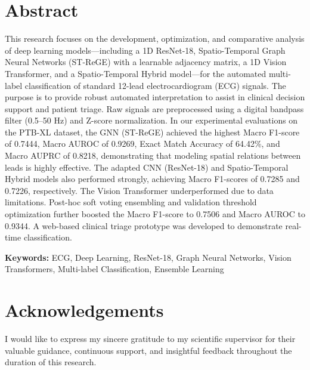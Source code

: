 \documentclass[12pt,a4paper]{report}
\begin{document}
\setcounter{page}{1} %

\chapter*{Abstract}

\begingroup
\sloppy

This research focuses on the development, optimization, and comparative analysis of deep learning models---including a 1D ResNet-18, Spatio-Temporal Graph Neural Networks (ST-ReGE) with a learnable adjacency matrix, a 1D Vision Transformer, and a Spatio-Temporal Hybrid model---for the automated multi-label classification of standard 12-lead electrocardiogram (ECG) signals. The purpose is to provide robust automated interpretation to assist in clinical decision support and patient triage. Raw signals are preprocessed using a digital bandpass filter (0.5--50 Hz) and Z-score normalization. In our experimental evaluations on the PTB-XL dataset, the GNN (ST-ReGE) achieved the highest Macro F1-score of 0.7444, Macro AUROC of 0.9269, Exact Match Accuracy of 64.42\%, and Macro AUPRC of 0.8218, demonstrating that modeling spatial relations between leads is highly effective. The adapted CNN (ResNet-18) and Spatio-Temporal Hybrid models also performed strongly, achieving Macro F1-scores of 0.7285 and 0.7226, respectively. The Vision Transformer underperformed due to data limitations. Post-hoc soft voting ensembling and validation threshold optimization further boosted the Macro F1-score to 0.7506 and Macro AUROC to 0.9344. A web-based clinical triage prototype was developed to demonstrate real-time classification.

\vspace{0.5cm}
\noindent\textbf{Keywords:} ECG, Deep Learning, ResNet-18, Graph Neural Networks, Vision Transformers, Multi-label Classification, Ensemble Learning

\endgroup

\clearpage

\chapter*{Acknowledgements}
I would like to express my sincere gratitude to my scientific supervisor for their valuable guidance, continuous support, and insightful feedback throughout the duration of this research.
\end{document}
